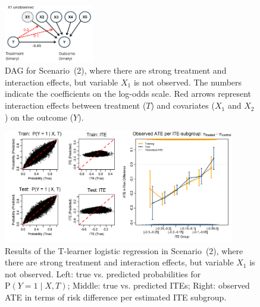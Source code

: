 \begin{figure}[htbp]
\centering
\includegraphics[width=0.35\textwidth]{img/results_ITE_simulation/simulation_unobserved.png}
\caption{DAG for Scenario~(2), where there are strong treatment and interaction effects, but variable $X_1$ is not observed. The numbers indicate the coefficients on the log-odds scale. Red arrows represent interaction effects between treatment ($T$) and covariates ($X_1$ and $X_2$) on the outcome ($Y$).}
\label{fig:unobserved_interaction_dag}
\end{figure}



\begin{figure}[htbp]
\centering
\includegraphics[width=0.9\textwidth]{img/results_ITE_simulation/unobserved_interaction_glm_tlearner.png}
\caption{Results of the T-learner logistic regression in Scenario~(2), where there are strong treatment and interaction effects, but variable $X_1$ is not observed. Left: true vs. predicted probabilities for $\text{P}(Y = 1 \mid X, T)$; Middle: true vs. predicted ITEs; Right: observed ATE in terms of risk difference per estimated ITE subgroup.}
\label{fig:unobserved_interaction_glm_tlearner}
\end{figure}



